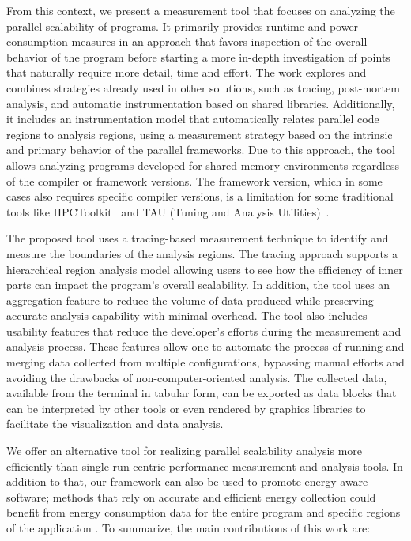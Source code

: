 From this context, we present a measurement tool that focuses on analyzing the parallel scalability of programs. It primarily provides runtime and power consumption measures in an approach that favors inspection of the overall behavior of the program before starting a more in-depth investigation of points that naturally require more detail, time and effort.
The work explores and combines strategies already used in other solutions, such as tracing, post-mortem analysis, and automatic instrumentation based on shared libraries. Additionally, it includes an instrumentation model that automatically relates parallel code regions to analysis regions, using a measurement strategy based on the intrinsic and primary behavior of the parallel frameworks. Due to this approach, the tool allows analyzing programs developed for shared-memory environments regardless of the compiler or framework versions. 
The framework version, which in some cases also requires specific compiler versions, is a limitation for some traditional tools like HPCToolkit~\cite{Adhianto2010} and TAU (Tuning and Analysis Utilities)~\cite{Shende2006}.

The proposed tool uses a tracing-based measurement technique to identify and measure the boundaries of the analysis regions. The tracing approach supports a hierarchical region analysis model allowing users to see how the efficiency of inner parts can impact the program's overall scalability. In addition, the tool uses an aggregation feature to reduce the volume of data produced while preserving accurate analysis capability with minimal overhead. The tool also includes usability features that reduce the developer's efforts during the measurement and analysis process. These features allow one to automate the process of running and merging data collected from multiple configurations, bypassing manual efforts and avoiding the drawbacks of non-computer-oriented analysis.
The collected data, available from the terminal in tabular form, can be exported as data blocks that can be interpreted by other tools or even rendered by graphics libraries to facilitate the visualization and data analysis.


We offer an alternative tool for realizing parallel scalability analysis more efficiently than single-run-centric performance measurement and analysis tools. In addition to that, our framework can also be used to promote energy-aware software; methods that rely on accurate and efficient energy collection could benefit from energy consumption data for the entire program and specific regions of the application \cite{10.1007/978-3-319-58667-0_22,10.1007/978-3-319-58667-0_21,7016382,10.1145/3321551}. To summarize, the main contributions of this work are:

